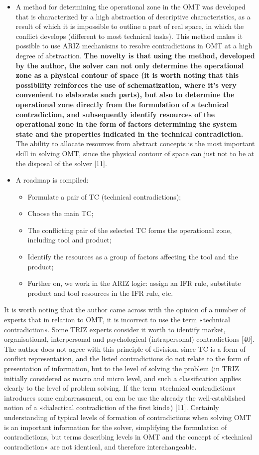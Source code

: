 \documentclass[11pt,a4paper]{book}
\begin{document}
\begin{itemize}
\item A method for determining the operational zone in the OMT was developed
  that is characterized by a high abstraction of descriptive characteristics,
  as a result of which it is impossible to outline a part of real space, in
  which the conflict develops (different to most technical tasks).  This
  method makes it possible to use ARIZ mechanisms to resolve contradictions in
  OMT at a high degree of abstraction. \textbf{The novelty is that using the
    method, developed by the author, the solver can not only determine the
    operational zone as a physical contour of space (it is worth noting that
    this possibility reinforces the use of schematization, where it’s very
    convenient to elaborate such parts), but also to determine the operational
    zone directly from the formulation of a technical contradiction, and
    subsequently identify resources of the operational zone in the form of
    factors determining the system state and the properties indicated in the
    technical contradiction.} The ability to allocate resources from abstract
  concepts is the most important skill in solving OMT, since the physical
  contour of space can just not to be at the disposal of the solver [11].
\item A roadmap is compiled:
  \begin{itemize}
  \item Formulate a pair of TC (technical contradictions);
  \item Choose the main TC;
  \item The conflicting pair of the selected TC forms the operational zone,
    including tool and product;
  \item Identify the resources as a group of factors affecting the tool and
    the product;
  \item Further on, we work in the ARIZ logic: assign an IFR rule, substitute
    product and tool resources in the IFR rule, etc.
  \end{itemize}
\end{itemize}
It is worth noting that the author came across with the opinion of a number of
experts that in relation to OMT, it is incorrect to use the term «technical
contradiction». Some TRIZ experts consider it worth to identify market,
organisational, interpersonal and psychological (intrapersonal) contradictions
[40]. The author does not agree with this principle of division, since TC is a
form of conflict representation, and the listed contradictions do not relate
to the form of presentation of information, but to the level of solving the
problem (in TRIZ initially considered as macro and micro level, and such a
classification applies clearly to the level of problem solving. If the term
«technical contradiction» introduces some embarrassment, on can be use the
already the well-established notion of a «dialectical contradiction of the
first kind») [11]. Certainly understanding of typical levels of formation of
contradictions when solving OMT is an important information for the solver,
simplifying the formulation of contradictions, but terms describing levels in
OMT and the concept of «technical contradiction» are not identical, and
therefore interchangeable.
\end{document}
